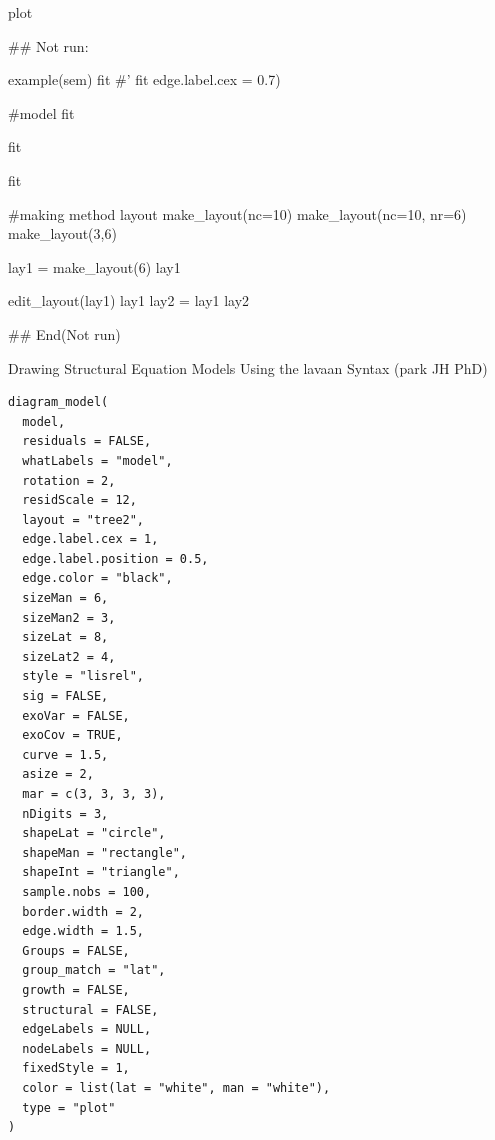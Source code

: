 \documentclass[a4paper]{book}
\begin{document}
%
\begin{Value}
plot
\end{Value}
%
\begin{Examples}
\begin{ExampleCode}

## Not run: 

example(sem)
fit%
#'
fit %
                edge.label.cex = 0.7)

#model
fit %

fit %

fit %

#making method layout
make_layout(nc=10)
make_layout(nc=10, nr=6)
make_layout(3,6)

lay1 = make_layout(6)
lay1

edit_layout(lay1)
lay1 %
lay2 = lay1 %
lay2


## End(Not run)


\end{ExampleCode}
\end{Examples}
%
\begin{Description}
Drawing Structural Equation Models Using the lavaan Syntax (park JH PhD)
\end{Description}
%
\begin{Usage}
\begin{verbatim}
diagram_model(
  model,
  residuals = FALSE,
  whatLabels = "model",
  rotation = 2,
  residScale = 12,
  layout = "tree2",
  edge.label.cex = 1,
  edge.label.position = 0.5,
  edge.color = "black",
  sizeMan = 6,
  sizeMan2 = 3,
  sizeLat = 8,
  sizeLat2 = 4,
  style = "lisrel",
  sig = FALSE,
  exoVar = FALSE,
  exoCov = TRUE,
  curve = 1.5,
  asize = 2,
  mar = c(3, 3, 3, 3),
  nDigits = 3,
  shapeLat = "circle",
  shapeMan = "rectangle",
  shapeInt = "triangle",
  sample.nobs = 100,
  border.width = 2,
  edge.width = 1.5,
  Groups = FALSE,
  group_match = "lat",
  growth = FALSE,
  structural = FALSE,
  edgeLabels = NULL,
  nodeLabels = NULL,
  fixedStyle = 1,
  color = list(lat = "white", man = "white"),
  type = "plot"
)
\end{verbatim}
\end{Usage}
%
\end{document}
